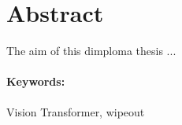 \documentclass[12pt, twoside]{book}
\begin{document}
\newpage 
\section*{Abstract}
The aim of this dimploma thesis ...

\paragraph*{Keywords:} Vision Transformer, wipeout


%
%
%




\cleardoublepage
\tableofcontents



\newpage 

\listoffigures
\listoftables


\mainmatter
\pagestyle{headings}


 










\newpage	

\backmatter

\thispagestyle{empty}
\clearpage

 

 
\end{document}
